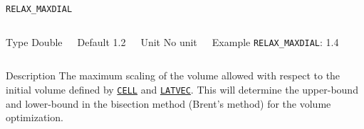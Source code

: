 \documentclass[xcolor=dvipsnames,t]{beamer}
\begin{document}
\begin{frame}[allowframebreaks]{\texttt{RELAX\_MAXDIAL}} \label{RELAX_MAXDIAL}
\vspace*{-12pt}
\begin{columns}
\begin{block}{Type}
Double
\end{block}

\begin{block}{Default}
1.2
\end{block}

\begin{block}{Unit}
No unit
\end{block}

\begin{block}{Example}
\texttt{RELAX\_MAXDIAL}: 1.4
\end{block}
\end{columns}

\begin{block}{Description}
The maximum scaling of the volume allowed with respect to the initial volume defined by \hyperlink{CELL}{\texttt{CELL}} and \hyperlink{LATVEC}{\texttt{LATVEC}}. This will determine the upper-bound and lower-bound in the bisection method (Brent's method) for the volume optimization.
\end{block}


\end{frame}
\end{document}
